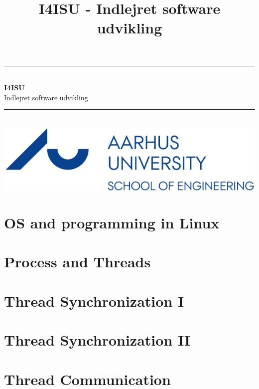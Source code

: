 \documentclass[12pt,a4paper,danish]{book}
\title{I4ISU -  Indlejret software udvikling}
\newcommand{\HRule}{\rule{\linewidth}{0.5mm}}
\begin{document}
\begin{titlepage}
	\clearpage\thispagestyle{empty}

	\begin{center}
		\HRule \\[0.4cm]
		{\huge \bfseries I4ISU} \\[.3cm] {\huge Indlejret software udvikling}\\[0cm]
		\HRule \\[3.4cm]
		\includegraphics[width=0.5\linewidth]{graphics/au}
	\end{center}
	\renewcommand{\contentsname}{Indholdsfortegnelse}
	\tableofcontents

\end{titlepage}
 

\chapter{OS and programming in Linux}


\chapter{Process and Threads}


\chapter{Thread Synchronization I}


\chapter{Thread Synchronization II}


\chapter{Thread Communication}

\end{document}
